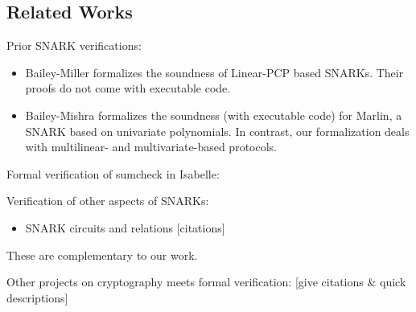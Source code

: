 \subsection{Related Works}\label{sec:related-works}

Prior SNARK verifications:
\begin{itemize}
    \item Bailey-Miller formalizes the soundness of Linear-PCP based SNARKs. Their proofs do not come with executable code.
    \item Bailey-Mishra formalizes the soundness (with executable code) for Marlin, a SNARK based on univariate polynomials. In contrast, our formalization deals with multilinear- and multivariate-based protocols.
\end{itemize}

Formal verification of sumcheck in Isabelle:

Verification of other aspects of SNARKs:
\begin{itemize}
    \item SNARK circuits and relations [citations] 
\end{itemize}
These are complementary to our work.

Other projects on cryptography meets formal verification: [give citations & quick descriptions]